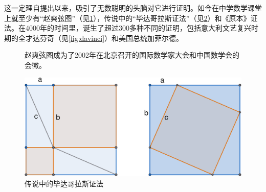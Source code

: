 \documentclass[b5paper]{ctexart}
\begin{document}
这一定理自提出以来，吸引了无数聪明的头脑对它进行证明。如今在中学数学课堂上就至少有“赵爽弦图”（见\cref{fig:cms-zhaoshuang}），传说中的“毕达哥拉斯证法”（见\cref{fig:pythagoras-pww}）和《原本》证法。在4000年的时间里，诞生了超过300多种不同的证明，包括意大利文艺复兴时期的全才达芬奇（见\cref{fig:davinci}）和美国总统加菲尔德。

\begin{figure}[htbp]
 \centering
  \quad
 \caption{赵爽弦图成为了2002年在北京召开的国际数学家大会和中国数学会的会徽。\label{fig:cms-zhaoshuang}}
\end{figure}

\begin{figure}[htbp]
 \centering
 \includegraphics[scale=0.3]{img/pythagoras-pww}
 \caption{传说中的毕达哥拉斯证法\label{fig:pythagoras-pww}}
\end{figure}
\end{document}
